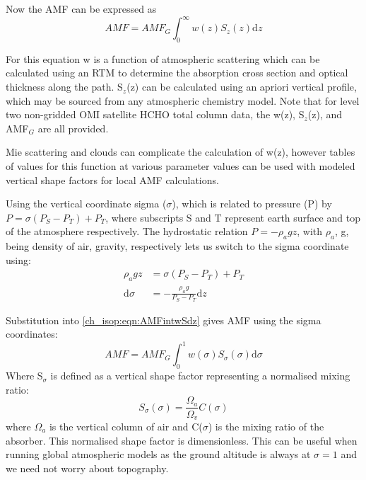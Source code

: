     Now the AMF can be expressed as
    \begin{equation} \label{ch_isop:eqn:AMFintwSdz}
      AMF = AMF_G \int_0^\infty w(z) S_z(z) \mathrm{d}z
    \end{equation}
    
    For this equation w is a function of atmospheric scattering which can be calculated using an RTM to determine the absorption cross section and optical thickness along the path.
    S$_z$(z) can be calculated using an apriori vertical profile, which may be sourced from any atmospheric chemistry model.
    Note that for level two non-gridded OMI satellite HCHO total column data, the w(z), S$_z$(z), and AMF$_G$ are all provided.
    
    Mie scattering and clouds can complicate the calculation of w(z), however tables of values for this function at various parameter values can be used with modeled vertical shape factors for local AMF calculations.
    
    Using the vertical coordinate sigma ($\sigma$), which is related to pressure (P) by $P=\sigma \left( P_S - P_T \right) + P_T$, where subscripts S and T represent earth surface and top of the atmosphere respectively.
    The hydrostatic relation $P = - \rho_a g z$, with $\rho_a$, g, being density of air, gravity, respectively lets us switch to the sigma coordinate using:
    \begin{align*}
      \rho_a g z & = \sigma \left( P_S - P_T \right) + P_T \\
      \mathrm{d}\sigma  & = - \frac{ \rho_a g }{ P_S - P_T } \mathrm{d}z
    \end{align*}
    
    Substitution into \ref{ch_isop:eqn:AMFintwSdz} gives AMF using the sigma coordinates:
    \begin{equation} \label{ch_isop:eqn:AMFintwSdsigma}
      AMF = AMF_G \int_0^1 w(\sigma) S_\sigma(\sigma) \mathrm{d}\sigma
    \end{equation}
    Where S$_\sigma$ is defined as a vertical shape factor representing a normalised mixing ratio:
    \begin{equation}
      S_\sigma (\sigma) = \frac{\Omega_a}{\Omega_v}C(\sigma)
    \end{equation}
    where $\Omega_a$ is the vertical column of air and C($\sigma$) is the mixing ratio of the absorber.
    This normalised shape factor is dimensionless.
    This can be useful when running global atmospheric models as the ground altitude is always at $\sigma=1$ and we need not worry about topography.
    
